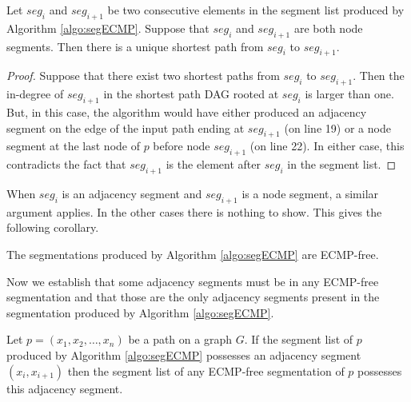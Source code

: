 \begin{lemma}
Let $\textit{seg}_i$ and $\textit{seg}_{i + 1}$ be two consecutive elements in the segment list produced
by Algorithm \ref{algo:segECMP}. Suppose that $\textit{seg}_i $ and $\textit{seg}_{i + 1}$ are both
node segments.
Then there is a unique shortest path from $\textit{seg}_i$ to $\textit{seg}_{i + 1}$.
\end{lemma}

\begin{proof}
Suppose that there exist two shortest paths from $\textit{seg}_i$ to $\textit{seg}_{i + 1}$.
Then the in-degree of $\textit{seg}_{i + 1}$ in the shortest path DAG rooted at $\textit{seg}_i$
is larger than one. But, in this case, the algorithm would have either produced an adjacency segment on the edge
of the input path ending at $\textit{seg}_{i + 1}$ (on line 19) or a node segment at the last node of $p$ before
node $\textit{seg}_{i + 1}$ (on line 22). In either case, this contradicts the fact that $\textit{seg}_{i + 1}$
is the element after $\textit{seg}_i$ in the segment list.
\end{proof}

When $\textit{seg}_i $ is an adjacency segment and $\textit{seg}_{i + 1}$ is a node segment,
a similar argument applies. In the other cases there is nothing to show.
This gives the following corollary.

\begin{corollary}
The segmentations produced by Algorithm \ref{algo:segECMP} are ECMP-free.
\end{corollary}

Now we establish that some adjacency segments must be in any ECMP-free segmentation
and that those are the only adjacency segments present in the segmentation produced by
Algorithm \ref{algo:segECMP}.

\begin{lemma}
Let $p = (x_1, x_2, \ldots, x_n)$ be a path on a graph $G$. 
If the segment list of $p$ produced by Algorithm \ref{algo:segECMP} possesses an adjacency segment $(x_i, x_{i + 1})$
then the segment list of any ECMP-free segmentation of $p$ possesses this adjacency segment.
\end{lemma}

